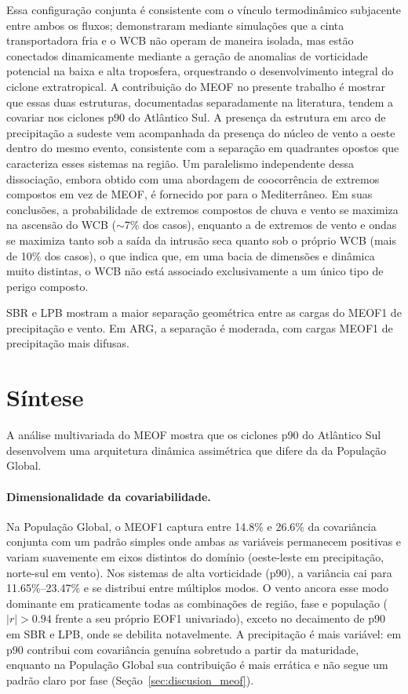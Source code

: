 Essa configuração conjunta é consistente com o vínculo termodinâmico subjacente entre ambos os fluxos; \citet{schemm2014linkage} demonstraram mediante simulações que a cinta transportadora fria e o WCB não operam de maneira isolada, mas estão conectados dinamicamente mediante a geração de anomalias de vorticidade potencial na baixa e alta troposfera, orquestrando o desenvolvimento integral do ciclone extratropical.
A contribuição do MEOF no presente trabalho é mostrar que essas duas estruturas, documentadas separadamente na literatura, tendem a covariar nos ciclones p90 do Atlântico Sul. A presença da estrutura em arco de precipitação a sudeste vem acompanhada da presença do núcleo de vento a oeste dentro do mesmo evento, consistente com a separação em quadrantes opostos que caracteriza esses sistemas na região.
Um paralelismo independente dessa dissociação, embora obtido com uma abordagem de coocorrência de extremos compostos em vez de MEOF, é fornecido por \citet{portal2024linking} para o Mediterrâneo. Em suas conclusões, a probabilidade de extremos compostos de chuva e vento se maximiza na ascensão do WCB (${\sim}$7\% dos casos), enquanto a de extremos de vento e ondas se maximiza tanto sob a saída da intrusão seca quanto sob o próprio WCB (mais de 10\% dos casos), o que indica que, em uma bacia de dimensões e dinâmica muito distintas, o WCB não está associado exclusivamente a um único tipo de perigo composto.

SBR e LPB mostram a maior separação geométrica entre as cargas do MEOF1 de precipitação e vento. Em ARG, a separação é moderada, com cargas MEOF1 de precipitação mais difusas.

\section{Síntese}
\label{sec:sintesis_meof}

A análise multivariada do MEOF mostra que os ciclones p90 do Atlântico Sul desenvolvem uma arquitetura dinâmica assimétrica que difere da da População Global.

\paragraph{Dimensionalidade da covariabilidade.}
Na População Global, o MEOF1 captura entre 14.8\% e 26.6\% da covariância conjunta com um padrão simples onde ambas as variáveis permanecem positivas e variam suavemente em eixos distintos do domínio (oeste-leste em precipitação, norte-sul em vento). Nos sistemas de alta vorticidade (p90), a variância cai para 11.65\%--23.47\% e se distribui entre múltiplos modos. O vento ancora esse modo dominante em praticamente todas as combinações de região, fase e população ($|r|>0.94$ frente a seu próprio EOF1 univariado), exceto no decaimento de p90 em SBR e LPB, onde se debilita notavelmente. A precipitação é mais variável: em p90 contribui com covariância genuína sobretudo a partir da maturidade, enquanto na População Global sua contribuição é mais errática e não segue um padrão claro por fase (Seção~\ref{sec:discusion_meof}).


